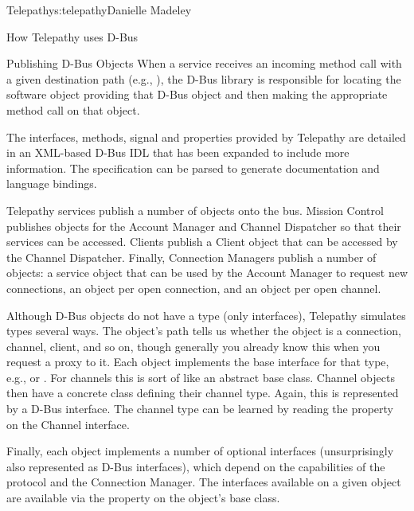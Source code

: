 \begin{aosachapter}{Telepathy}{s:telepathy}{Danielle Madeley}
\begin{aosasect1}{How Telepathy uses D-Bus}
\begin{aosabox}{Publishing D-Bus Objects}
When a service receives an incoming method call with a given
destination path (e.g., ), the D-Bus
library is responsible for locating the software object providing that
D-Bus object and then making the appropriate method call on that
object.

\end{aosabox}

The interfaces, methods, signal and properties provided by Telepathy
are detailed in an XML-based D-Bus IDL that has been expanded to
include more information.  The specification can be parsed to generate
documentation and language bindings.

Telepathy services publish a number of objects onto the bus. Mission
Control publishes objects for the Account Manager and Channel
Dispatcher so that their services can be accessed. Clients publish a
Client object that can be accessed by the Channel Dispatcher. Finally,
Connection Managers publish a number of objects: a service object that
can be used by the Account Manager to request new connections, an
object per open connection, and an object per open channel.

Although D-Bus objects do not have a type (only interfaces), Telepathy
simulates types several ways. The object's path tells us whether the
object is a connection, channel, client, and so on, though generally
you already know this when you request a proxy to it. Each object
implements the base interface for that type, e.g.,
 or .  For channels this is
sort of like an abstract base class.  Channel objects then have a
concrete class defining their channel type.  Again, this is
represented by a D-Bus interface. The channel type can be learned by
reading the  property on the Channel interface.

Finally, each object implements a number of optional interfaces
(unsurprisingly also represented as D-Bus interfaces), which depend on
the capabilities of the protocol and the Connection Manager.  The
interfaces available on a given object are available via the
 property on the object's base class.


\end{aosasect1}
\end{aosachapter}
